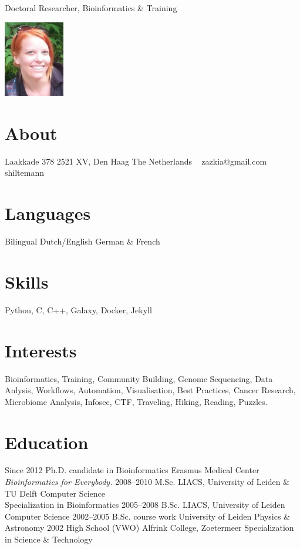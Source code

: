 \documentclass[]{shiltemann-cv}
\begin{document}
       {Doctoral Researcher, Bioinformatics \& Training}


\begin{aside}
  \includegraphics[width=75pt]{foto.jpg}
  \section{About}
    Laakkade 378
    2521 XV, Den Haag
    The Netherlands
    ~
    zazkia@gmail.com \faEnvelope
    shiltemann \faGithub \ \faTwitter \ \faLinkedin

  \section{Languages}
    Bilingual Dutch/English
    German \& French
  \section{Skills}
    Python, C, C++, Galaxy, Docker, Jekyll
\end{aside}

\section{Interests}

Bioinformatics, Training, Community Building, Genome Sequencing, Data Anlysis, Workflows, Automation, Visualisation, Best Practices, Cancer Research, Microbiome Analysis, Infosec, CTF, Traveling, Hiking, Reading, Puzzles.

\section{Education}

\begin{entrylist}
  \entry
    {Since 2012}
    {Ph.D. {\normalfont candidate in Bioinformatics}}
    {Erasmus Medical Center}
    {\emph{Bioinformatics for Everybody.}}
  \entry
    {2008–2010}
    {M.Sc.}
    {LIACS, University of Leiden \& TU Delft}
    {Computer Science\\
    Specialization in Bioinformatics}
  \entry
    {2005–2008}
    {B.Sc.}
    {LIACS, University of Leiden}
    {Computer Science}
  \entry
    {2002–2005}
    {B.Sc. course work}
    {University of Leiden}
    {Physics \& Astronomy}
  \entry
    {2002}
    {High School (VWO)}
    {Alfrink College, Zoetermeer}
    {Specialization in Science \& Technology}
\end{entrylist}
\end{document}
